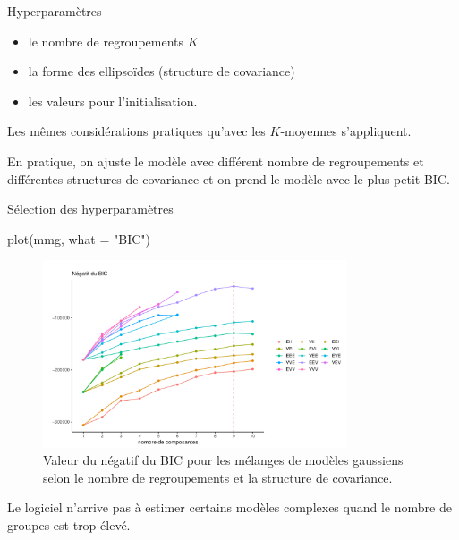 \documentclass[
  ignorenonframetext,
]{beamer}
\newenvironment{Shaded}{\begin{snugshade}}{\end{snugshade}}
\newcommand{\AttributeTok}[1]{\textcolor[rgb]{0.40,0.45,0.13}{#1}}
\newcommand{\FunctionTok}[1]{\textcolor[rgb]{0.28,0.35,0.67}{#1}}
\newcommand{\NormalTok}[1]{\textcolor[rgb]{0.00,0.23,0.31}{#1}}
\newcommand{\StringTok}[1]{\textcolor[rgb]{0.13,0.47,0.30}{#1}}
\providecommand{\tightlist}{%
  \setlength{\itemsep}{0pt}\setlength{\parskip}{0pt}}\usepackage{longtable,booktabs,array}
\begin{document}
\begin{frame}{Hyperparamètres}
\protect\hypertarget{hyperparamuxe8tres}{}
\begin{itemize}
\tightlist
\item
  le nombre de regroupements \(K\)
\item
  la forme des ellipsoïdes (structure de covariance)
\item
  les valeurs pour l'initialisation.
\end{itemize}

Les mêmes considérations pratiques qu'avec les \(K\)-moyennes
s'appliquent.

En pratique, on ajuste le modèle avec différent nombre de regroupements
et différentes structures de covariance et on prend le modèle avec le
plus petit BIC.
\end{frame}

\begin{frame}[fragile]{Sélection des hyperparamètres}
\protect\hypertarget{suxe9lection-des-hyperparamuxe8tres}{}
\begin{Shaded}
\begin{Highlighting}[numbers=left,,]
\FunctionTok{plot}\NormalTok{(mmg, }\AttributeTok{what =} \StringTok{"BIC"}\NormalTok{)}
\end{Highlighting}
\end{Shaded}

\footnotesize

\begin{figure}

{\centering \includegraphics[width=0.8\textwidth,height=\textheight]{MATH60602-diapos12_files/figure-beamer/fig-mclustbic-1.pdf}

}

\caption{\label{fig-mclustbic}Valeur du négatif du BIC pour les mélanges
de modèles gaussiens selon le nombre de regroupements et la structure de
covariance.}

\end{figure}

Le logiciel n'arrive pas à estimer certains modèles complexes quand le
nombre de groupes est trop élevé.
\end{frame}
\end{document}
